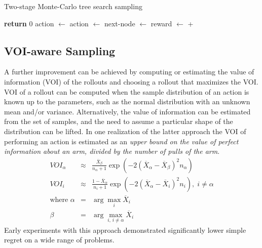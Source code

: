 \documentclass[letterpaper]{article}
\begin{document}
\begin{algorithm}[t]
\caption{Two-stage Monte-Carlo tree search sampling}
\label{alg:two-stage-mcts}
\begin{algorithmic}[1]
    \State \textbf{return} 0
  \Else
      \State action $\gets$ 
    \Else
      \State action $\gets$ 
    \EndIf
    \State next-node $\gets$ 
    \State reward $\gets$ 
     \State \hspace{4em} + 
    \State {}
  \EndIf
\EndProcedure
\end{algorithmic}
\end{algorithm}

\subsection{VOI-aware Sampling}

A further improvement can be achieved by computing or estimating the
value of information (VOI) of the rollouts and choosing a rollout that
maximizes the VOI. VOI of a rollout can be computed when the sample
distribution of an action is known up to the parameters, such as the
normal distribution with an unknown mean and/or
variance. Alternatively, the value of information can be estimated
from the set of samples, and the need to assume a particular shape of
the distribution can be lifted. In one realization of the latter
approach the VOI of performing an action is estimated as an
\emph{upper bound on the value of perfect information about an arm,
divided by the number of pulls of the arm}.
\begin{eqnarray}
VOI_\alpha&\approx&\frac {\overline X_\beta} {n_\alpha+1}
\exp\left(-2(\overline X_\alpha - \overline X_\beta)^2 n_\alpha\right)\\
VOI_i&\approx&\frac {1-\overline X_\alpha} {n_i+1}
\exp\left(-2(\overline X_\alpha - \overline X_i)^2 n_i\right),\; i\ne\alpha\nonumber\\
\mbox{where }\alpha&=&\arg\max_i \overline X_i\nonumber\\
             \beta&=&\arg\max_{i,\,i\ne\alpha} \overline X_i\nonumber
\end{eqnarray}
Early experiments with this approach demonstrated
significantly lower simple regret on a wide range of problems.
\end{document}
